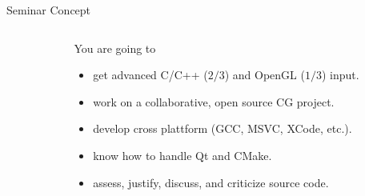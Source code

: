 
\begin{frame}[plain]
\end{frame}


\begin{frame}{Seminar Concept}
	
	\center
	\begin{columns}
		\begin{column}{0.3\textwidth}


		\end{column}
		\begin{column}{0.6\textwidth}

			You are going to
			\bigskip

			\pause
			\small
			\begin{itemize}

				\item get advanced C/C++ ($2/3$) and OpenGL ($1/3$) input.\smallskip
				\pause
				\item work on a collaborative, open source CG project.\smallskip
				\pause
				\item develop cross plattform (GCC, MSVC, XCode, etc.).\smallskip
				\pause
				\item know how to handle Qt and CMake.\smallskip
				\pause
				\item assess, justify, discuss, and criticize source code.\smallskip

			\end{itemize}

		\end{column}
	\end{columns}	

\end{frame}


